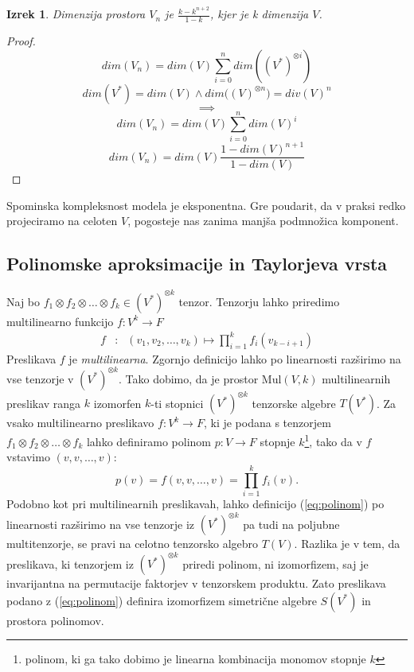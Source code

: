 \documentclass{article}
\newtheorem{izrek}{Izrek}[section]
\begin{document}
\begin{izrek}
 Dimenzija prostora $V_n$ je $\frac{k-k^{n+2}}{1-k}$, kjer je k dimenzija $V$.
 \end{izrek}

\begin{proof}
	$$dim(V_n)=dim(V)\sum\limits_{i=0}^{n}dim((V^*)^{\otimes i})$$
	$$dim(V^*)=dim(V)\land dim\Big((V)^{\otimes n}\Big)=div(V)^n$$
	$$\implies$$
	$$dim(V_n)=dim(V)\sum\limits_{i=0}^{n}dim(V)^{i}$$
	$$dim(V_n)=dim(V)\frac{1-dim(V)^{n+1}}{1-dim(V)}$$
\end{proof}

Spominska kompleksnost modela je eksponentna. Gre poudarit, da v praksi redko projeciramo na celoten $V$, pogosteje nas zanima manjša podmnožica komponent.
\subsection{Polinomske aproksimacije in Taylorjeva vrsta}
Naj bo $f_1\otimes f_2\otimes \ldots \otimes f_k\in (V^*)^{\otimes k}$
tenzor. Tenzorju lahko priredimo multilinearno funkcijo $f:V^k\to F$ 
\begin{eqnarray}
  \label{eq:multilinear}
f&:&(v_1,v_2,\ldots,v_k) \mapsto \prod_{i=1}^k f_i(v_{k-i+1}) 
\end{eqnarray}
Preslikava $f$ je \emph{multilinearna}. Zgornjo definicijo lahko po linearnosti
razširimo na vse tenzorje v $(V^*)^{\otimes k}$. Tako dobimo, da je prostor
$\mathrm{Mul}(V,k)$ multilinearnih preslikav ranga $k$ izomorfen $k$-ti stopnici
$(V^*)^{\otimes k}$ tenzorske algebre $T(V^*)$. 
Za vsako multilinearno preslikavo $f:V^k\to F$, ki je podana s tenzorjem
$f_1\otimes f_2\otimes\ldots \otimes f_k$ lahko definiramo polinom $p:V\to
F$ stopnje $k$\footnote{polinom, ki ga tako dobimo je linearna kombinacija monomov stopnje $k$}, tako da v $f$ vstavimo $(v,v,\ldots, v)$:
\begin{equation}
  \label{eq:polinom}
  p(v) = f(v,v,\ldots, v) = \prod_{i=1}^kf_i(v).
\end{equation}
Podobno kot pri multilinearnih preslikavah, lahko definicijo (\ref{eq:polinom})
po linearnosti razširimo na vse tenzorje iz $(V^*)^{\otimes k}$ pa tudi na
poljubne multitenzorje, se pravi na celotno tenzorsko algebro $T(V)$. Razlika je v
tem, da preslikava, ki tenzorjem iz $(V^*)^{\otimes k}$ priredi polinom, ni
izomorfizem, saj je invarijantna na permutacije faktorjev v tenzorskem
produktu. Zato preslikava podano z (\ref{eq:polinom}) definira izomorfizem
simetrične algebre $S(V^*)$ in prostora polinomov.
\end{document}
